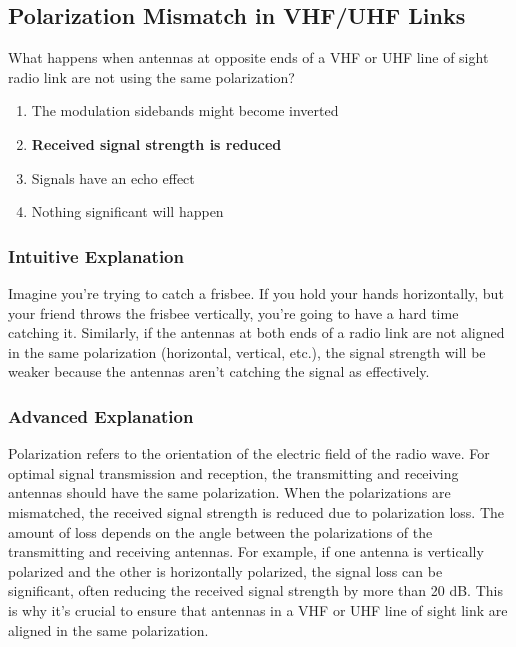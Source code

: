 \subsection{Polarization Mismatch in VHF/UHF Links}
\label{T3A04}

\begin{tcolorbox}[colback=gray!10!white,colframe=black!75!black,title=T3A04]
What happens when antennas at opposite ends of a VHF or UHF line of sight radio link are not using the same polarization?
\begin{enumerate}[noitemsep]
    \item The modulation sidebands might become inverted
    \item \textbf{Received signal strength is reduced}
    \item Signals have an echo effect
    \item Nothing significant will happen
\end{enumerate}
\end{tcolorbox}

\subsubsection*{Intuitive Explanation}
Imagine you're trying to catch a frisbee. If you hold your hands horizontally, but your friend throws the frisbee vertically, you're going to have a hard time catching it. Similarly, if the antennas at both ends of a radio link are not aligned in the same polarization (horizontal, vertical, etc.), the signal strength will be weaker because the antennas aren't catching the signal as effectively.

\subsubsection*{Advanced Explanation}
Polarization refers to the orientation of the electric field of the radio wave. For optimal signal transmission and reception, the transmitting and receiving antennas should have the same polarization. When the polarizations are mismatched, the received signal strength is reduced due to polarization loss. The amount of loss depends on the angle between the polarizations of the transmitting and receiving antennas. For example, if one antenna is vertically polarized and the other is horizontally polarized, the signal loss can be significant, often reducing the received signal strength by more than 20 dB. This is why it's crucial to ensure that antennas in a VHF or UHF line of sight link are aligned in the same polarization.